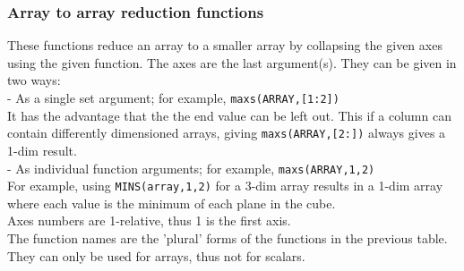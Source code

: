 \subsubsection{Array to array reduction functions}
These functions reduce an array to a smaller array by collapsing
the given axes using the given function. The axes are the last argument(s).
They can be given in two ways:
\\- As a single set argument; for example, \texttt{maxs(ARRAY,[1:2])}
\\  It has the advantage that the the end value can be left out. This
if a column can contain differently dimensioned arrays, giving
\texttt{maxs(ARRAY,[2:])} always gives a 1-dim result.
\\- As individual function arguments; for example, \texttt{maxs(ARRAY,1,2)}
\\For example, using
\texttt{MINS(array,1,2)} for a 3-dim array results in a 1-dim array
where each value is the minimum of each plane in the cube.
\\Axes numbers are 1-relative, thus 1 is the first axis.
\\The function names are the 'plural' forms of the
functions in the previous table.
They can only be used for arrays, thus not for scalars.
